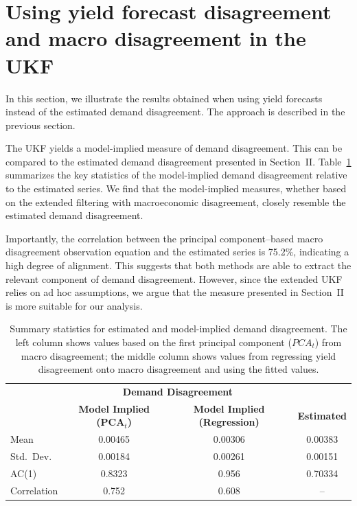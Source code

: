 \section{Using yield forecast disagreement and macro disagreement in the UKF}
In this section, we illustrate the results obtained when using yield forecasts instead of the estimated demand disagreement. The approach is described in the previous section.

The UKF yields a model-implied measure of demand disagreement. This can be compared to the estimated demand disagreement presented in Section~II. Table~\ref{table:DemandDisagreementComparison} summarizes the key statistics of the model-implied demand disagreement relative to the estimated series. We find that the model-implied measures, whether based on the extended filtering with macroeconomic disagreement, closely resemble the estimated demand disagreement.

Importantly, the correlation between the principal component–based macro disagreement observation equation and the estimated series is 75.2\%, indicating a high degree of alignment. This suggests that both methods are able to extract the relevant component of demand disagreement. However, since the extended UKF relies on ad hoc assumptions, we argue that the measure presented in Section~II is more suitable for our analysis.


\begin{table}[H]
    \centering
    \begin{tabular}{lccc}
        \toprule
        & \multicolumn{2}{c}{\textbf{Demand Disagreement}} \\
        \cmidrule(lr){2-4}
        & \textbf{Model Implied (PCA$_t$)} & \textbf{Model Implied (Regression)} & \textbf{Estimated} \\
        \midrule
        Mean        & 0.00465 & 0.00306 & 0.00383 \\
        Std.\ Dev.  & 0.00184 & 0.00261 & 0.00151 \\
        AC(1)       & 0.8323  & 0.956   & 0.70334 \\
        \midrule
        Correlation & 0.752   & 0.608   & -- \\
        \bottomrule
    \end{tabular}
    \vspace{0.5em}
    \caption{Summary statistics for estimated and model-implied demand disagreement. The left column shows values based on the first principal component ($PCA_t$) from macro disagreement; the middle column shows values from regressing yield disagreement onto macro disagreement and using the fitted values.}
    \label{table:DemandDisagreementComparison}
\end{table}

